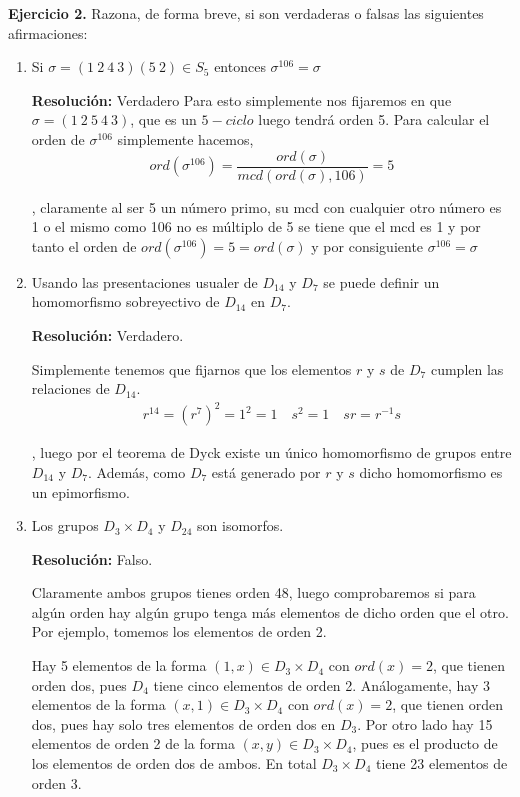 \documentclass{article}
\begin{document}
\textbf{Ejercicio 2.} Razona, de forma breve, si son verdaderas o falsas las siguientes afirmaciones:
\begin{enumerate}
\item Si $\sigma=(1\:2\:4\:3)(5\:2)\in S_5$ entonces $\sigma^{106}=\sigma$

\textbf{Resolución:} Verdadero
Para esto simplemente nos fijaremos en que $\sigma=(1\:2\:5\:4\:3)$, que es un $5-ciclo$ luego tendrá orden 5. Para calcular el orden de $\sigma^{106}$ simplemente hacemos,
\begin{equation*}
ord(\sigma^{106})=\frac{ord(\sigma)}{mcd(ord(\sigma),106)}=5
\end{equation*}

, claramente al ser 5 un número primo, su mcd con cualquier otro número es 1 o el mismo como 106 no es múltiplo de 5 se tiene que el mcd es 1 y por tanto el orden de $ord(\sigma^{106})=5=ord(\sigma)$ y por consiguiente $\sigma^{106}=\sigma$

\item Usando las presentaciones usualer de $D_{14}$ y $D_7$ se puede definir un homomorfismo sobreyectivo de $D_{14}$ en $D_7$.

\textbf{Resolución:} Verdadero.

Simplemente tenemos que fijarnos que los elementos $r$ y $s$ de $D_7$ cumplen las relaciones de $D_{14}$. 
\begin{gather*}
r^{14}=(r^7)^2=1^2=1\quad s^2=1\quad sr=r^{-1}s
\end{gather*}

, luego por el teorema de Dyck existe un único homomorfismo de grupos entre $D_{14}$ y $D_7$. Además, como $D_{7}$ está generado por $r$ y $s$ dicho homomorfismo es un epimorfismo.
\item Los grupos $D_3\times D_4$ y $D_{24}$ son isomorfos.

\textbf{Resolución:} Falso.

Claramente ambos grupos tienes orden 48, luego comprobaremos si para algún orden hay algún grupo tenga más elementos de dicho orden que el otro. Por ejemplo, tomemos los elementos de orden 2.

Hay 5 elementos de la forma $(1,x)\in D_3\times D_4$ con $ord(x)=2$, que tienen orden dos, pues $D_4$ tiene cinco elementos de orden 2. Análogamente, hay 3 elementos de la forma $(x,1)\in D_3\times D_4$ con $ord(x)=2$, que tienen orden dos, pues hay solo tres elementos de orden dos en $D_3$. Por otro lado hay 15 elementos de orden 2 de la forma $(x,y)\in D_3\times D_4$, pues es el producto de los elementos de orden dos de ambos. En total $D_3\times D_4$ tiene 23 elementos de orden 3.


\end{enumerate}
\end{document}
